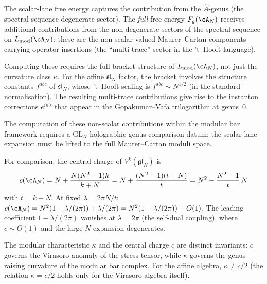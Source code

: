 \begin{remark}
\label{rem:beyond-scalar-lane}
The scalar-lane free energy captures the contribution from the
$\hat{A}$-genus (the spectral-sequence-degenerate sector). The
\emph{full} free energy $F_g(\cA_N)$ receives additional
contributions from the non-degenerate sectors of the spectral sequence
on $L_{\mathrm{mod}}(\cA_N)$: these are the
non-scalar-valued Maurer--Cartan components carrying operator
insertions (the ``multi-trace'' sector in the 't~Hooft language).

Computing these requires the full bracket structure of
$L_{\mathrm{mod}}(\cA_N)$, not just the curvature class $\kappa$.
For the affine $\mathfrak{sl}_N$ factor, the bracket involves the
structure constants $f^{abc}$ of $\mathfrak{sl}_N$, whose
't~Hooft scaling is $f^{abc} \sim N^{1/2}$ (in the standard
normalisation). The resulting multi-trace contributions give rise to
the instanton corrections $e^{in\lambda}$ that appear in the
Gopakumar--Vafa trilogarithm at genus~$0$.

The computation of these non-scalar contributions within the modular
bar framework requires a
$\mathrm{GL}_N$ holographic genus comparison datum: the scalar-lane
expansion must be lifted to the full Maurer--Cartan moduli space.
\end{remark}

\begin{remark}
\label{rem:central-charge-1overN}
For comparison: the central charge of $V^k(\mathfrak{gl}_N)$ is
\[
c(\cA_N)
= N + \frac{N(N^2-1)k}{k+N}
= N + \frac{(N^2-1)(t-N)}{t}
= N^2 - \frac{N^2 - 1}{t}\,N
\]
with $t = k + N$. At fixed $\lambda = 2\pi N/t$:
$c(\cA_N) = N^2(1 - \lambda/(2\pi)) + \lambda/(2\pi)
= N^2(1 - \lambda/(2\pi)) + O(1)$.
The leading coefficient $1 - \lambda/(2\pi)$ vanishes at
$\lambda = 2\pi$ (the self-dual coupling), where
$c \sim O(1)$ and the large-$N$ expansion degenerates.

The modular characteristic $\kappa$ and the central charge $c$ are
distinct invariants: $c$ governs the Virasoro anomaly of the
stress tensor, while $\kappa$ governs the genus-raising curvature of
the modular bar complex. For the affine algebra, $\kappa \neq c/2$
(the relation $\kappa = c/2$ holds only for the Virasoro algebra
itself).
\end{remark}

